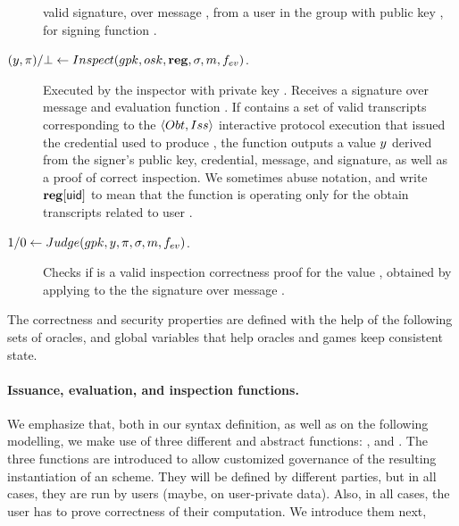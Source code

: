 \begin{description}
  valid signature, over message \msg, from a user in the group with public key
  \gpk, for signing function \feval.
\item[$(y,\pi)/\bot \gets Inspect(gpk,osk,\mathbf{reg},\sigma,m,f_{ev})$.] %
  Executed by the inspector with private key \osk. Receives a signature \sig
  over message \msg and evaluation function \feval. If \trans contains a set of
  valid transcripts corresponding
  to the $\langle Obt,Iss\rangle$ interactive protocol execution that
  issued the credential used to produce \sig, the function outputs a value $y$
  derived from the signer's public key, credential, message, and signature, as
  well as a proof of correct inspection. We sometimes abuse notation, and write
  $\mathbf{reg}[\mathsf{uid}]$ to mean that the \Inspect function is operating only for the
  obtain transcripts related to user \uid.
\item[$1/0 \gets Judge(gpk,y,\pi,\sigma,m,f_{ev})$.] %
  Checks if \iproof is a valid inspection correctness proof for the value \y,
  obtained by applying \Inspect to the the signature \sig over message \msg. 
\end{description}

The correctness and security properties are defined with the help of the
following sets of oracles, and global variables that help oracles and games
keep consistent state.

\paragraph{Issuance, evaluation, and inspection functions.} %
We emphasize that, both in our syntax definition, as well as on the following
modelling, we make use of three different and abstract functions: \fissue,
\feval and \finsp. The three functions are introduced to allow customized
governance of the resulting instantiation of an \UAS scheme. They will be
defined by different parties, but in all cases, they are run by users (maybe,
on user-private data). Also, in all cases, the user has to prove correctness of
their computation. We introduce them next, 

